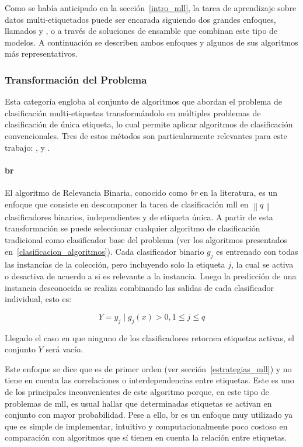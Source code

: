 Como se había anticipado en la sección~\ref{intro_mll}, la tarea de aprendizaje
sobre datos multi-etiquetados puede ser encarada siguiendo dos grandes enfoques,
llamados  y , o a través de soluciones de ensamble que combinan este tipo de
modelos. A continuación se describen ambos enfoques y algunos de sus algoritmos
más representativos.

\subsubsection{Transformación del Problema}

Esta categoría engloba al conjunto de algoritmos que abordan el problema de
clasificación multi-etiquetas transformándolo en múltiples problemas de
clasificación de única etiqueta, lo cual permite aplicar algoritmos de
clasificación convencionales. Tres de estos métodos son particularmente
relevantes para este trabajo: ,  y
.

\paragraph{\acrfull{br}}

El algoritmo de Relevancia Binaria, conocido como \textit{\acrlong{br}} en la
literatura, es un enfoque que consiste en descomponer la tarea de clasificación
\acrshort{mll} en $\left\|q\right\|$ clasificadores binarios, independientes y
de etiqueta única.  A partir de esta transformación se puede seleccionar
cualquier algoritmo de clasificación tradicional como clasificador base del
problema (ver los algoritmos presentados en~\ref{clasificacion_algoritmos}).
Cada clasificador binario $g_{j}$ es entrenado con todas las instancias de la
colección, pero incluyendo solo la etiqueta $j$, la cual se activa o desactiva
de acuerdo a si es relevante a la instancia. Luego la predicción de una
instancia desconocida se realiza combinando las salidas de cada clasificador
individual, esto es:

\begin{equation}
	Y = {y_{j} \mid g_{j}(x) > 0, 1 \leq j \leq q}
\end{equation}

Llegado el caso en que ninguno de los clasificadores retornen etiquetas activas,
el conjunto $Y$ será vacío.

Este enfoque se dice que es de primer orden (ver sección~\ref{estrategias_mll})
y no tiene en cuenta las correlaciones o interdependencias entre etiquetas. Este
es uno de los principales inconvenientes de este algoritmo porque, en este tipo
de problemas de \acrshort{mll}, es usual hallar que determinadas etiquetas se
activan en conjunto con mayor probabilidad. Pese a ello, \acrshort{br} es un
enfoque muy utilizado \cite{zhang_review_2014} ya que es simple de implementar,
intuitivo y computacionalmente poco costoso en comparación con algoritmos que sí
tienen en cuenta la relación entre etiquetas.

